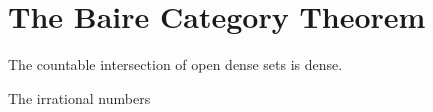 \section{The Baire Category Theorem}

\begin{theorem}
    The countable intersection of open dense sets is dense.  
\end{theorem}

\begin{example}{The irrational numbers }
    
\end{example}